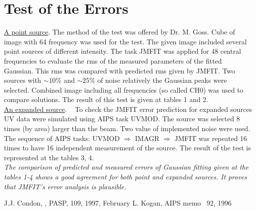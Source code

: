 \section{Test of the Errors}
\underline {A point source}.
The method of the test was offered by Dr. M. Goss. Cube of image with 64 frequency was used for the test. The given image included several point sources of different intensity. The task JMFIT was applied for 48 central frequencies to evaluate the rms of the measured parameters of the fitted Gaussian. This rms was compared with predicted rms given by JMFIT. Two sources with $\sim 10 \%$
and $\sim 25 \%$ of noise relatively the Gaussian peaks were selected. Combined image including all frequencies (so called CH0) was used to compare solutions.
The result of this test is given at tables 1 and 2. \\
\underline {An expanded source}. ~
To check the JMFIT error prediction for expanded sources UV data were simulated
using AIPS task UVMOD.  The source was selected 8 times (by area) larger than the beam.
Two value of implemented noise were used. The sequence of AIPS tasks: UVMOD
$\Rightarrow$ IMAGR $\Rightarrow$ JMFIT was repeated 16 times to have 16 independent measurement of the source. The result of the test is represented at the tables 3, 4. \\

{\em The comparison of predicted and measured errors of Gaussian fitting given at the tables 1-4 shows a good agreement for both point and expanded sources.
It proves that JMFIT's error analysis is plausible.}
\begin{thebibliography}{99}
   J.J. Condon, , PASP, 109, 1997, February
   L. Kogan, AIPS memo~ 92, 1996
\end{thebibliography}
\newpage

